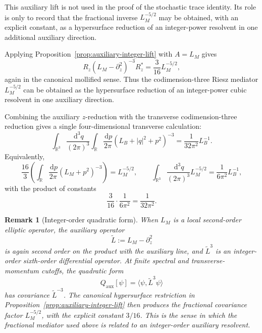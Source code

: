 \documentclass[11pt]{article}
\newtheorem{remark}[theorem]{Remark}
\newcommand{\R}{\mathbb{R}}
\newcommand{\dd}{\,\mathrm{d}}
\begin{document}
This auxiliary lift is not used in the proof of the stochastic trace
identity.  Its role is only to record that the fractional inverse
\(L_M^{-5/2}\) may be obtained, with an explicit constant, as a hypersurface
reduction of an integer-power resolvent in one additional auxiliary
direction.

Applying Proposition~\ref{prop:auxiliary-integer-lift} with \(A=L_M\)
gives
\begin{equation}
    R_z(L_M-\partial_z^2)^{-3}R_z^\ast
    =
    \frac{3}{16}L_M^{-5/2},
    \label{eq:LM-fivehalf-from-cubic}
\end{equation}
again in the canonical mollified sense.  Thus the codimension-three Riesz
mediator \(L_M^{-5/2}\) can be obtained as the hypersurface reduction of an
integer-power cubic resolvent in one auxiliary direction.

Combining the auxiliary \(z\)-reduction with the transverse
codimension-three reduction gives a single four-dimensional transverse
calculation:
\begin{equation}
    \int_{\R^3}\frac{\dd^3 q}{(2\pi)^3}
    \int_{\R}\frac{\dd p}{2\pi}
    (L_B+|q|^2+p^2)^{-3}
    =
    \frac{1}{32\pi^2}L_B^{-1}.
    \label{eq:combined-four-dimensional-reduction}
\end{equation}
Equivalently,
\begin{equation}
    \frac{16}{3}
    \left(
    \int_{\R}\frac{\dd p}{2\pi}
    (L_M+p^2)^{-3}
    \right)
    =
    L_M^{-5/2},
    \qquad
    \int_{\R^3}\frac{\dd^3 q}{(2\pi)^3}
    L_M^{-5/2}
    =
    \frac{1}{6\pi^2}L_B^{-1},
    \label{eq:two-step-reduction-chain}
\end{equation}
with the product of constants
\[
    \frac{3}{16}\cdot\frac{1}{6\pi^2}
    =
    \frac{1}{32\pi^2}.
\]

\begin{remark}[Integer-order quadratic form]
When \(L_M\) is a local second-order elliptic operator, the auxiliary
operator
\[
    \widetilde L:=L_M-\partial_z^2
\]
is again second order on the product with the auxiliary line, and
\(\widetilde L^3\) is an integer-order sixth-order differential operator.
At finite spectral and transverse-momentum cutoffs, the quadratic form
\[
    Q_{\mathrm{aux}}[\psi]
    =
    \big\langle \psi,\widetilde L^3\psi\big\rangle
\]
has covariance \(\widetilde L^{-3}\).  The canonical hypersurface
restriction in Proposition~\ref{prop:auxiliary-integer-lift} then produces
the fractional covariance factor \(L_M^{-5/2}\), with the explicit constant
\(3/16\).  This is the sense in which the fractional mediator used above is
related to an integer-order auxiliary resolvent.
\end{remark}
\end{document}
